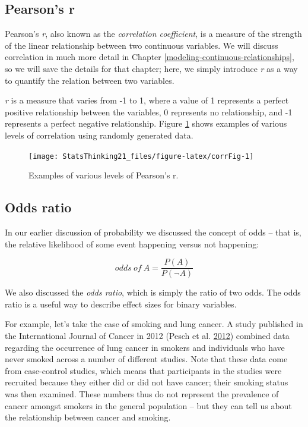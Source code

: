 \documentclass[12pt,]{book}
\theoremstyle{definition}
\theoremstyle{definition}
\theoremstyle{definition}
\theoremstyle{remark}
\begin{document}
\hypertarget{pearsons-r}{%
\subsection{Pearson's r}\label{pearsons-r}}

Pearson's \emph{r}, also known as the \emph{correlation coefficient}, is a measure of the strength of the linear relationship between two continuous variables. We will discuss correlation in much more detail in Chapter \ref{modeling-continuous-relationships}, so we will save the details for that chapter; here, we simply introduce \emph{r} as a way to quantify the relation between two variables.

\emph{r} is a measure that varies from -1 to 1, where a value of 1 represents a perfect positive relationship between the variables, 0 represents no relationship, and -1 represents a perfect negative relationship. Figure \ref{fig:corrFig} shows examples of various levels of correlation using randomly generated data.

\begin{figure}
\texttt{[image: StatsThinking21\_files/figure-latex/corrFig-1]} \caption{Examples of various levels of Pearson's r.}\label{fig:corrFig}
\end{figure}

\hypertarget{odds-ratio}{%
\subsection{Odds ratio}\label{odds-ratio}}

In our earlier discussion of probability we discussed the concept of odds -- that is, the relative likelihood of some event happening versus not happening:

\[
odds\ of\ A = \frac{P(A)}{P(\neg A)}
\]

We also discussed the \emph{odds ratio}, which is simply the ratio of two odds. The odds ratio is a useful way to describe effect sizes for binary variables.

For example, let's take the case of smoking and lung cancer. A study published in the International Journal of Cancer in 2012 (Pesch et al. \protect\hyperlink{ref-pesc:kend:gust:2012}{2012}) combined data regarding the occurrence of lung cancer in smokers and individuals who have never smoked across a number of different studies. Note that these data come from case-control studies, which means that participants in the studies were recruited because they either did or did not have cancer; their smoking status was then examined. These numbers thus do not represent the prevalence of cancer amongst smokers in the general population -- but they can tell us about the relationship between cancer and smoking.
\end{document}
